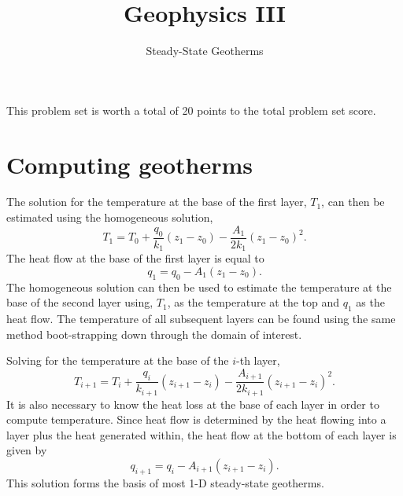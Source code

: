 \documentclass[final,a4paper,12pt]{article}
\title{Geophysics III}
\author{Steady-State Geotherms}
\date{}
\begin{document}
\maketitle
%

\noindent This problem set is worth a total of 20 points to the total problem set score.

\begin{enumerate}
    

    

    
\end{enumerate}

\appendix
\section{Computing geotherms}\label{apx:g}

The solution for the temperature at the base of the first layer,
$T_{1}$, can then be estimated using the homogeneous solution,
\begin{equation}
  T_1 = T_0 + \frac{q_0}{k_1} (z_1 - z_0) -
  \frac{A_1}{2 k_1} (z_1 - z_0)^2.
\end{equation}
The heat flow at the base of the first layer is equal to
\begin{equation}
    q_{1} = q_0 - A_1 (z_1 - z_0).
\end{equation}
The homogeneous solution can then be used to estimate the temperature at
the base of the second layer using, $T_1$, as the temperature at the
top and $q_1$ as the heat flow.  The temperature of all subsequent
layers can be found using the same method boot-strapping down through
the domain of interest.  

Solving for the temperature at the base of the $i$-th layer,
\begin{equation}
  T_{i+1} = T_i + \frac{q_i}{k_{i+1}} (z_{i+1} - z_i)
  - \frac{A_{i+1}}{2 k_{i+1}} (z_{i+1} - z_i)^2.
\end{equation}
It is also necessary to know the heat loss at the base of each layer in
order to compute temperature.  Since heat flow is determined by the heat
flowing into a layer plus the heat generated within, the heat flow at
the bottom of each layer is given by
\begin{equation}
    q_{i+1} = q_i - A_{i+1} (z_{i+1} - z_i).
\end{equation}
This solution forms the basis of most 1-D steady-state geotherms.
\end{document}
